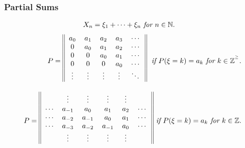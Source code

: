 \documentclass{article}
\begin{document}
\newpage
\subsubsection{Partial Sums}
\begin{align*}
    X_n & = \xi_1 + \dots + \xi_n \emph{ for } n\in \mathbb{N}.
\end{align*}
\begin{align*}
    P = 
    \begin{blockarray}{ccccc}
        \begin{block}{||ccccc||}
            a_0 & a_1 & a_2 & a_3 & \cdots \\
            0 & a_0 & a_1 & a_2 & \cdots \\
            0 & 0 & a_0 & a_1 & \cdots \\
            0 & 0 & 0 & a_0 & \cdots \\
            \vdots & \vdots & \vdots & \vdots & \ddots \\
        \end{block} 
    \end{blockarray}\; \emph{ if } P(\xi = k) = a_k \emph{ for }k \in \mathbb{Z^{^\ge}}. \\
    P = 
    \begin{blockarray}{cccccc}
        \begin{block}{||cccccc||}
            & \vdots & \vdots & \vdots & \vdots & \\
            \cdots & a_{-1} & a_0 & a_1 & a_2 & \cdots \\
            \cdots & a_{-2} & a_{-1} & a_0 & a_1 & \cdots \\
            \cdots & a_{-3} & a_{-2} & a_{-1} & a_0 & \cdots \\
            & \vdots & \vdots & \vdots & \vdots & \\
        \end{block} 
    \end{blockarray} \emph{ if } P(\xi = k) = a_k \emph{ for }k \in \mathbb{Z}.
\end{align*}
\end{document}
